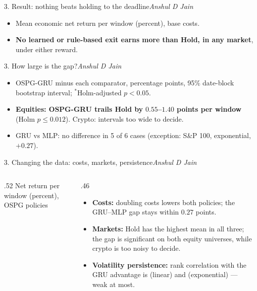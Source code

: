 \documentclass[aspectratio=169,11pt]{beamer}
\newcommand{\by}[1]{\hfill{\normalfont\small\itshape #1}}
\begin{document}
\begin{frame}{3. Result: nothing beats holding to the deadline\by{Anshul D Jain}}
\centering\scriptsize
\resizebox{\linewidth}{!}{}

\vspace{6pt}\normalsize
\begin{itemize}
\item Mean economic net return per window (percent), base costs.
\item \textbf{No learned or rule-based exit earns more than Hold, in any market}, under
  either reward.
\end{itemize}
\end{frame}

\begin{frame}{3. How large is the gap?\by{Anshul D Jain}}
\centering\scriptsize
\resizebox{\linewidth}{!}{}

\vspace{6pt}\normalsize
\begin{itemize}\small
\item OSPG-GRU minus each comparator, percentage points, 95\% date-block bootstrap interval;
  $^{*}$Holm-adjusted $p<0.05$.
\item \textbf{Equities: OSPG-GRU trails Hold by $0.55$--$1.40$ points per window}
  (Holm $p\le0.012$). Crypto: intervals too wide to decide.
\item GRU vs MLP: no difference in 5 of 6 cases (exception: S\&P 100, exponential, $+0.27$).
\end{itemize}
\end{frame}

\begin{frame}{3. Changing the data: costs, markets, persistence\by{Anshul D Jain}}
\begin{columns}[T]
\begin{column}{.52\textwidth}\centering\scriptsize
Net return per window (percent), OSPG policies\\[2pt]
\resizebox{\linewidth}{!}{}
\end{column}
\begin{column}{.46\textwidth}
\begin{itemize}\small
\item \textbf{Costs:} doubling costs lowers both policies; the GRU--MLP gap stays within
  $0.27$ points.
\item \textbf{Markets:} Hold has the highest mean in all three; the gap is significant on
  both equity universes, while crypto is too noisy to decide.
\item \textbf{Volatility persistence:} rank correlation with the GRU advantage is
  \perslinear{} (linear) and \persexponential{} (exponential) --- weak at most.
\end{itemize}
\end{column}
\end{columns}
\end{frame}
\end{document}
